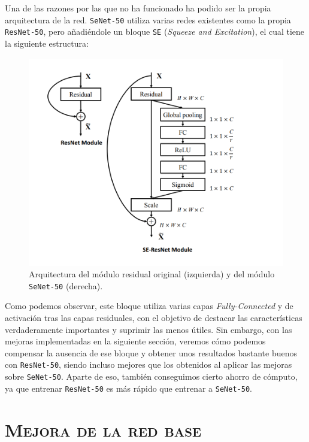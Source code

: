 \documentclass[11pt,a4paper]{article}
\begin{document}
Una de las razones por las que no ha funcionado ha podido ser la propia arquitectura de la red. \texttt{SeNet-50}
utiliza varias redes existentes como la propia \texttt{ResNet-50}, pero añadiéndole un bloque \texttt{SE}
(\textit{Squeeze and Excitation}), el cual tiene la siguiente estructura:

\begin{figure}[H]
    \centering
    \includegraphics[scale=0.45]{img/senet-arch.png}
    \caption{Arquitectura del módulo residual original (izquierda) y del módulo \texttt{SeNet-50} (derecha).
    \protect\cite{DBLP:journals/corr/abs-1709-01507}}
    \label{fig:senet-arch}
\end{figure}

Como podemos observar, este bloque utiliza varias capas \textit{Fully-Connected} y de activación tras las capas
residuales, con el objetivo de destacar las características verdaderamente importantes y suprimir las menos útiles.
Sin embargo, con las mejoras implementadas en la siguiente sección, veremos cómo podemos compensar la ausencia de ese
bloque y obtener unos resultados bastante buenos con \texttt{ResNet-50}, siendo incluso mejores que los obtenidos
al aplicar las mejoras sobre \texttt{SeNet-50}. Aparte de eso, también conseguimos cierto ahorro de cómputo, ya que
entrenar \texttt{ResNet-50} es más rápido que entrenar a \texttt{SeNet-50}.


\section{\textsc{Mejora de la red base}}
\end{document}
